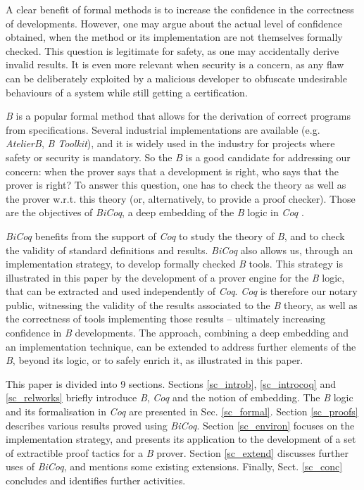 \documentclass{llncs}
\begin{document}
\newcommand{\Binf}{\ensuremath{\:\dot{\vdash}\:}}




A clear benefit of formal methods is to increase the confidence in the correctness of 
developments. However, one may argue about the actual level of confidence obtained, when the 
method or its implementation are not themselves formally checked. This question is legitimate 
for safety, as one may accidentally derive invalid results. It is even more relevant when 
security is a concern, as any flaw can be deliberately exploited by a malicious developer to 
obfuscate undesirable behaviours of a system while still getting a certification.

\emph{B} \cite{abr:1} is a popular formal method that allows for the derivation of correct 
programs from specifications. Several industrial implementations are available (e.g. 
\emph{AtelierB}, \emph{B Toolkit}), and it is widely used in the industry for projects where 
safety or security is mandatory. So the \emph{B} is a good candidate for addressing our 
concern: when the prover says that a development is right, who says that the prover is right? 
To answer this question, one has to check the theory as well as the prover w.r.t. this theory 
(or, alternatively, to provide a proof checker). Those are the objectives of \emph{BiCoq}, a 
deep embedding of the \emph{B} logic  in \emph{Coq} \cite{coq:1}.

\emph{BiCoq} benefits from the support of \emph{Coq} to study the theory of \emph{B}, and to 
check the validity of standard definitions and results. \emph{BiCoq} also allows us, through 
an implementation strategy, to develop formally checked \emph{B} tools. This strategy is 
illustrated in this paper by the development of a prover engine for the \emph{B} logic, that 
can be extracted and used independently of \emph{Coq}. \emph{Coq} is therefore our notary 
public, witnessing the validity of the results associated to the \emph{B} theory, as well as 
the correctness of tools implementing those results -- ultimately increasing confidence in 
\emph{B} developments. The approach, combining a deep embedding and an implementation 
technique, can be extended to address further elements of the \emph{B}, beyond its logic, or 
to safely enrich it, as illustrated in this paper.

This paper is divided into 9 sections. Sections \ref{sc_introb}, \ref{sc_introcoq} and
\ref{sc_relworks} briefly introduce \emph{B}, \emph{Coq} and the notion of embedding. The 
\emph{B} logic and its formalisation in \emph{Coq} are presented in Sec. \ref{sc_formal}. 
Section \ref{sc_proofs} describes various results proved using \emph{BiCoq}. Section 
\ref{sc_environ} focuses on the implementation strategy, and presents its application to the 
development of a set of extractible proof tactics for a \emph{B} prover. Section 
\ref{sc_extend} discusses further uses of \emph{BiCoq}, and mentions some existing extensions. 
Finally, Sect. \ref{sc_conc} concludes and identifies further activities.
\end{document}
